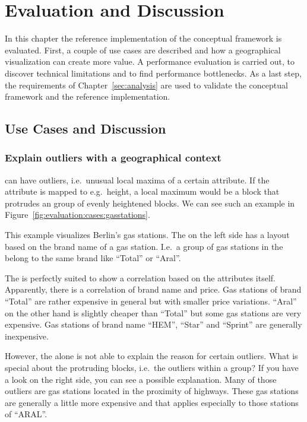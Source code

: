 \chapter{Evaluation and Discussion}\label{sec:evaluation}

In this chapter the reference implementation of the conceptual framework is evaluated.
First, a couple of use cases are described and how a geographical visualization can create more value.
A performance evaluation is carried out, to discover technical limitations and to find performance bottlenecks.
As a last step, the requirements of Chapter~\ref{sec:analysis} are used to validate the conceptual framework and the reference implementation.

\section{Use Cases and Discussion}\label{sec:use-case}



\subsection{Explain outliers with a geographical context}

\tmaps{} can have outliers, i.e.\ unusual local maxima of a certain attribute.
If the attribute is mapped to e.g.\ height, a local maximum would be a block that protrudes an group of evenly heightened blocks.
We can see such an example in Figure~\ref{fig:evaluation:cases:gasstations}.

This example visualizes Berlin's gas stations.
The \tmap{} on the left side has a layout based on the brand name of a gas station.
I.e.\ a group of gas stations in the \tmap{} belong to the same brand like ``Total'' or ``Aral''.

The \tmap{} is perfectly suited to show a correlation based on the attributes itself.
Apparently, there is a correlation of brand name and price.
Gas stations of brand ``Total'' are rather expensive in general but with smaller price variations.
``Aral'' on the other hand is slightly cheaper than ``Total'' but some gas stations are very expensive.
Gas stations of brand name ``HEM'', ``Star'' and ``Sprint'' are generally inexpensive.

However, the \tmap{} alone is not able to explain the reason for certain outliers.
What is special about the protruding blocks, i.e.\ the outliers within a group?
If you have a look on the right side, you can see a possible explanation.
Many of those outliers are gas stations located in the proximity of highways.
These gas stations are generally a little more expensive and that applies especially to those stations of ``ARAL''.



